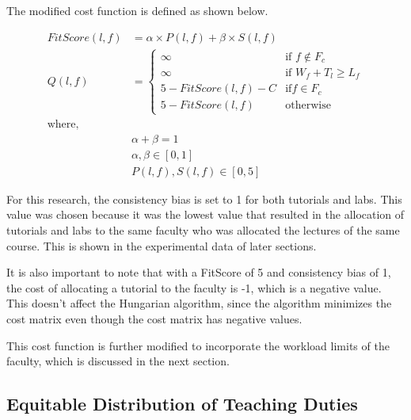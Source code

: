 The modified cost function is defined as shown below.

\begin{equation*}
  \begin{aligned}
    FitScore(l, f) & = \alpha \times P(l, f) + \beta \times S(l, f)          \\
    Q(l, f)        & = \begin{cases}
                         \infty                 & \text{if } f \notin F_c      \\
                         \infty                 & \text{if } W_f + T_l \ge L_f \\
                         5 - FitScore(l, f) - C & \text{if} f \in F_c          \\
                         5 - FitScore(l, f)     & \text{otherwise}
                       \end{cases} \\
    \text{where, } &                                                         \\
                   & \alpha + \beta = 1                                      \\
                   & \alpha, \beta \in [0, 1]                                \\
                   & P(l, f), S(l, f) \in [0, 5]
  \end{aligned}
\end{equation*}

For this research, the consistency bias is set to 1 for both tutorials and labs. This value was chosen because it was the lowest value that resulted in the allocation of tutorials and labs to the same faculty who was allocated the lectures of the same course. This is shown in the experimental data of later sections.

It is also important to note that with a FitScore of 5 and consistency bias of 1, the cost of allocating a tutorial to the faculty is -1, which is a negative value. This doesn't affect the Hungarian algorithm, since the algorithm minimizes the cost matrix even though the cost matrix has negative values.

This cost function is further modified to incorporate the workload limits of the faculty, which is discussed in the next section.

\subsection{Equitable Distribution of Teaching Duties}
\label{sec:workload_limits}

